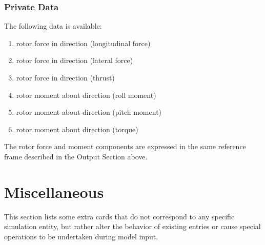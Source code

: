 \subsubsection{Private Data}
The following data is available:
\begin{enumerate}
\item {} rotor force in  direction (longitudinal force)
\item {} rotor force in  direction (lateral force)
\item {} rotor force in  direction (thrust)
\item {} rotor moment about  direction (roll moment)
\item {} rotor moment about  direction (pitch moment)
\item {} rotor moment about  direction (torque)
\end{enumerate}
The rotor force and moment components are expressed in the same reference
frame described in the Output Section above.



\section{Miscellaneous}
This section lists some extra cards that do not correspond to any
specific simulation entity, but rather alter the behavior 
of existing entries or cause special operations to be undertaken
during model input.



